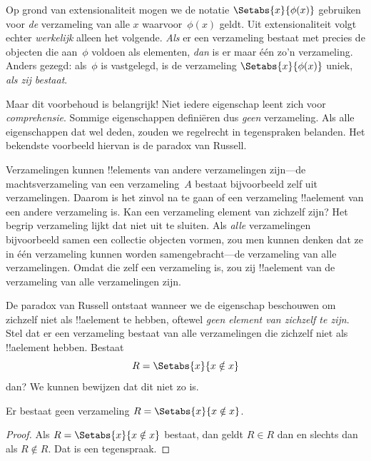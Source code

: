 \documentclass[../../../include/open-logic-section]{subfiles}
\begin{document}

Op grond van extensionaliteit mogen we de notatie
$\Setabs{x}{\phi(x)}$ gebruiken voor \emph{de} verzameling van alle
$x$ waarvoor~$\phi(x)$ geldt. Uit extensionaliteit volgt echter
\emph{werkelijk} alleen het volgende. \emph{Als} er een verzameling
bestaat met precies de objecten die aan~$\phi$ voldoen als elementen,
\emph{dan} is er maar één zo'n verzameling. Anders gezegd: als~$\phi$
is vastgelegd, is de verzameling
$\Setabs{x}{\phi(x)}$ uniek, \emph{als zij bestaat}.

Maar dit voorbehoud is belangrijk!{} Niet iedere eigenschap leent
zich voor \emph{comprehensie}. Sommige eigenschappen definiëren dus
\emph{geen} verzameling. Als alle eigenschappen dat wel deden, zouden
we regelrecht in tegenspraken belanden. Het bekendste voorbeeld
hiervan is de paradox van Russell.

Verzamelingen kunnen !!{element}s van andere verzamelingen zijn---de
machtsverzameling van een verzameling~$A$ bestaat bijvoorbeeld zelf
uit verzamelingen. Daarom is het zinvol na te gaan of een verzameling
!!a{element} van een andere verzameling is. Kan een verzameling
element van zichzelf zijn? Het begrip verzameling lijkt dat niet uit
te sluiten. Als \emph{alle} verzamelingen bijvoorbeeld samen een
collectie objecten vormen, zou men kunnen denken dat ze in één
verzameling kunnen worden samengebracht---de verzameling van alle
verzamelingen. Omdat die zelf een verzameling is, zou zij
!!a{element} van de verzameling van alle verzamelingen zijn.

De paradox van Russell ontstaat wanneer we de eigenschap beschouwen
om zichzelf niet als !!a{element} te hebben, oftewel \emph{geen
element van zichzelf te zijn}. Stel dat er een verzameling bestaat
van alle verzamelingen die zichzelf niet als !!a{element} hebben.
Bestaat
\[
R = \Setabs{x}{x \notin x}
\]
dan? We kunnen bewijzen dat dit niet zo is.

\begin{thm}
	Er bestaat geen verzameling $R = \Setabs{x}{x \notin x}$.
\end{thm}

\begin{proof}
Als $R = \Setabs{x}{x \notin x}$ bestaat, dan geldt
$R \in R$ dan en slechts dan als $R \notin R$. Dat is een tegenspraak.
\end{proof}
\end{document}
